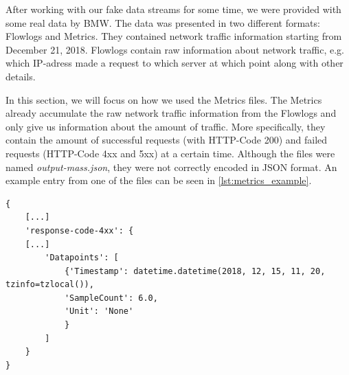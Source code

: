 \label{sec:fixed_data}
After working with our fake data streams for some time, we were provided with some real data by BMW. The data was presented in two different formats: Flowlogs and Metrics. They contained network traffic information  starting from December 21, 2018. 
Flowlogs contain raw information about network traffic, e.g. which IP-adress made a request to which server at which point along with other details.

In this section, we will focus on how we used the Metrics files. The Metrics already accumulate the raw network traffic information from the Flowlogs and only give us information about the amount of traffic. More specifically, they contain the amount of successful requests (with HTTP-Code 200) and failed requests (HTTP-Code 4xx and 5xx) at a certain time. Although the files were named \textit{output-mass.json}, they were not correctly encoded in JSON format. An example entry from one of the files can be seen in \ref{lst:metrics_example}.

\begin{minipage}{\linewidth}
\begin{lstlisting}[caption={Example entry from metrics data},label={lst:metrics_example}]
{
    [...]
    'response-code-4xx': {
    [...]
        'Datapoints': [
            {'Timestamp': datetime.datetime(2018, 12, 15, 11, 20, tzinfo=tzlocal()), 
            'SampleCount': 6.0, 
            'Unit': 'None'
            }
        ]
    }
}
\end{lstlisting}
\end{minipage}

